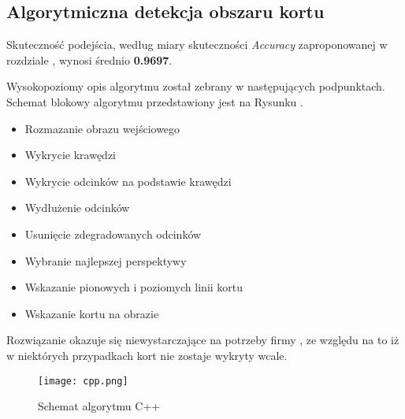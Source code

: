 \subsection{Algorytmiczna detekcja obszaru kortu}

Skuteczność podejścia, według miary skuteczności \textit{Accuracy} zaproponowanej w rozdziale , wynosi średnio \textbf{0.9697}.

Wysokopoziomy opis algorytmu został zebrany w następujących podpunktach. Schemat blokowy algorytmu przedstawiony jest na Rysunku .

\begin{itemize}
  \item Rozmazanie obrazu wejściowego
  \item Wykrycie krawędzi
  \item Wykrycie odcinków na podstawie krawędzi
  \item Wydłużenie odcinków
  \item Usunięcie zdegradowanych odcinków
  \item Wybranie najlepszej perspektywy
  \item Wskazanie pionowych i poziomych linii kortu
  \item Wskazanie kortu na obrazie
\end{itemize}

Rozwiązanie okazuje się niewystarczające na potrzeby firmy \blue, ze względu na to iż w niektórych przypadkach kort nie zostaje wykryty wcale.

\begin{figure}[h]
  \centering
  \caption{Schemat algorytmu C++}
  \texttt{[image: cpp.png]}
  \label{fig:algcpp}
\end{figure}

